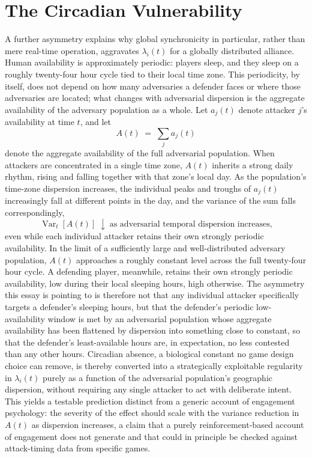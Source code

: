 \documentclass[11pt]{article}
\begin{document}
\section{The Circadian Vulnerability}

A further asymmetry explains why global synchronicity in particular, rather than mere real-time operation, aggravates $\lambda_i(t)$ for a globally distributed alliance. Human availability is approximately periodic: players sleep, and they sleep on a roughly twenty-four hour cycle tied to their local time zone. This periodicity, by itself, does not depend on how many adversaries a defender faces or where those adversaries are located; what changes with adversarial dispersion is the aggregate availability of the adversary population as a whole. Let $a_j(t)$ denote attacker $j$'s availability at time $t$, and let
\[
A(t) \;=\; \sum_j a_j(t)
\]
denote the aggregate availability of the full adversarial population. When attackers are concentrated in a single time zone, $A(t)$ inherits a strong daily rhythm, rising and falling together with that zone's local day. As the population's time-zone dispersion increases, the individual peaks and troughs of $a_j(t)$ increasingly fall at different points in the day, and the variance of the sum falls correspondingly,
\[
\operatorname{Var}_t[A(t)] \;\downarrow\; \text{as adversarial temporal dispersion increases,}
\]
even while each individual attacker retains their own strongly periodic availability. In the limit of a sufficiently large and well-distributed adversary population, $A(t)$ approaches a roughly constant level across the full twenty-four hour cycle. A defending player, meanwhile, retains their own strongly periodic availability, low during their local sleeping hours, high otherwise. The asymmetry this essay is pointing to is therefore not that any individual attacker specifically targets a defender's sleeping hours, but that the defender's periodic low-availability window is met by an adversarial population whose aggregate availability has been flattened by dispersion into something close to constant, so that the defender's least-available hours are, in expectation, no less contested than any other hours. Circadian absence, a biological constant no game design choice can remove, is thereby converted into a strategically exploitable regularity in $\lambda_i(t)$ purely as a function of the adversarial population's geographic dispersion, without requiring any single attacker to act with deliberate intent. This yields a testable prediction distinct from a generic account of engagement psychology: the severity of the effect should scale with the variance reduction in $A(t)$ as dispersion increases, a claim that a purely reinforcement-based account of engagement does not generate and that could in principle be checked against attack-timing data from specific games.
\end{document}
